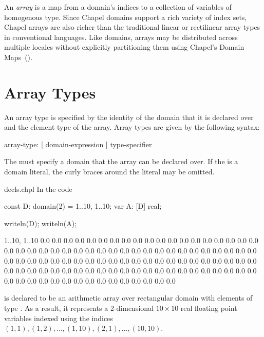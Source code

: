 \label{Arrays}

An \emph{array} is a map from a domain's indices to a collection of
variables of homogenous type.  Since Chapel domains support a rich
variety of index sets, Chapel arrays are also richer than the
traditional linear or rectilinear array types in conventional
languages.  Like domains, arrays may be distributed across multiple
locales without explicitly partitioning them using Chapel's Domain
Maps~().


\section{Array Types}
\label{Array_Types}

An array type is specified by the identity of the domain that it is
declared over and the element type of the array.  Array types are
given by the following syntax:

\begin{syntax}
array-type:
  [ domain-expression ] type-specifier
\end{syntax}
The  must specify a domain that the array can
be declared over.  If the  is a domain
literal, the curly braces around the literal may be omitted.

\begin{chapelexample}{decls.chpl}
In the code
\begin{chapel}
const D: domain(2) = {1..10, 1..10};
var A: [D] real;
\end{chapel}
\begin{chapelpost}
writeln(D);
writeln(A);
\end{chapelpost}
\begin{chapeloutput}
{1..10, 1..10}
0.0 0.0 0.0 0.0 0.0 0.0 0.0 0.0 0.0 0.0
0.0 0.0 0.0 0.0 0.0 0.0 0.0 0.0 0.0 0.0
0.0 0.0 0.0 0.0 0.0 0.0 0.0 0.0 0.0 0.0
0.0 0.0 0.0 0.0 0.0 0.0 0.0 0.0 0.0 0.0
0.0 0.0 0.0 0.0 0.0 0.0 0.0 0.0 0.0 0.0
0.0 0.0 0.0 0.0 0.0 0.0 0.0 0.0 0.0 0.0
0.0 0.0 0.0 0.0 0.0 0.0 0.0 0.0 0.0 0.0
0.0 0.0 0.0 0.0 0.0 0.0 0.0 0.0 0.0 0.0
0.0 0.0 0.0 0.0 0.0 0.0 0.0 0.0 0.0 0.0
0.0 0.0 0.0 0.0 0.0 0.0 0.0 0.0 0.0 0.0
\end{chapeloutput}
 is declared to be an arithmetic array over rectangular
domain  with elements of type .  As a result, it
represents a 2-dimensional $10 \times 10$ real floating point
variables indexed using the indices $(1, 1), (1, 2), \ldots, (1, 10),
(2, 1), \ldots, (10, 10)$.
\end{chapelexample}

